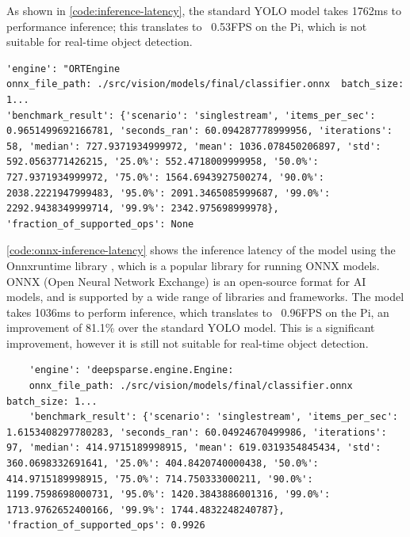 As shown in \autoref{code:inference-latency}, the standard YOLO model takes 1762ms to performance inference; this translates to ~0.53FPS on the Pi, which is not suitable for real-time object detection. 

\begin{minipage}[H]{\textwidth}
  \centering
  \begin{verbatim}
'engine': "ORTEngine
onnx_file_path: ./src/vision/models/final/classifier.onnx  batch_size: 1...
'benchmark_result': {'scenario': 'singlestream', 'items_per_sec': 0.9651499692166781, 'seconds_ran': 60.094287778999956, 'iterations': 58, 'median': 727.9371934999972, 'mean': 1036.078450206897, 'std': 592.0563771426215, '25.0%': 552.4718009999958, '50.0%': 727.9371934999972, '75.0%': 1564.6943927500274, '90.0%': 2038.2221947999483, '95.0%': 2091.3465085999687, '99.0%': 2292.9438349999714, '99.9%': 2342.975698999978}, 'fraction_of_supported_ops': None
  \end{verbatim}
  \label{code:onnx-inference-latency}
\end{minipage}

\autoref{code:onnx-inference-latency} shows the inference latency of the model using the Onnxruntime library \cite{onnxruntime}, which is a popular library for running ONNX models. ONNX (Open Neural Network Exchange) is an open-source format for AI models, and is supported by a wide range of libraries and frameworks. The model takes 1036ms to perform inference, which translates to ~0.96FPS on the Pi, an improvement of 81.1\% over the standard YOLO model. This is a significant improvement, however it is still not suitable for real-time object detection.

\begin{minipage}[H]{\textwidth}
  \centering
  \begin{verbatim}
    'engine': 'deepsparse.engine.Engine:
    onnx_file_path: ./src/vision/models/final/classifier.onnx batch_size: 1...
    'benchmark_result': {'scenario': 'singlestream', 'items_per_sec': 1.6153408297780283, 'seconds_ran': 60.04924670499986, 'iterations': 97, 'median': 414.9715189998915, 'mean': 619.0319354845434, 'std': 360.0698332691641, '25.0%': 404.8420740000438, '50.0%': 414.9715189998915, '75.0%': 714.750333000211, '90.0%': 1199.7598698000731, '95.0%': 1420.3843886001316, '99.0%': 1713.9762652400166, '99.9%': 1744.4832248240787}, 'fraction_of_supported_ops': 0.9926
  \end{verbatim}
  \label{code:deepsparse-inference-latency}
\end{minipage}

